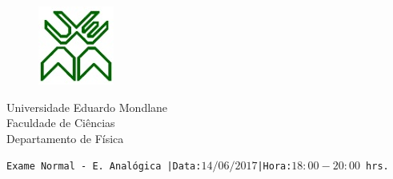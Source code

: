 \documentclass[11pt,a4paper,twoside]{report}
\author{Bartolomeu J. Ubisse}
\begin{document}
\begin{figure}[htb]

\centering
\includegraphics[scale=1]{UEM-logotipo}
\end{figure}
\centering
{ \Large Universidade Eduardo Mondlane}\\[0.3cm] 
\large Faculdade de Ci\^encias\\[0.2cm]
 \large Departamento de F\'isica\\[0.5cm]

\begin{flushleft}
\tt Exame Normal - E. Anal\'ogica\hspace{0.25cm} |Data:$14/06/2017$\hspace{0.25cm}|Hora:$18:00-20:00$ hrs.\\
\hrulefill
\end{flushleft}
\end{document}
